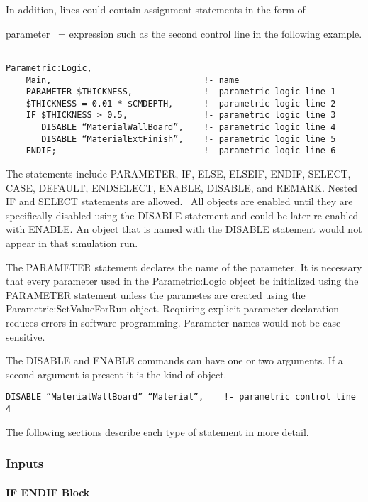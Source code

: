 In addition, lines could contain assignment statements in the form of

parameter~ = expression such as the second control line in the following example.

\begin{lstlisting}

Parametric:Logic,
    Main,                              !- name
    PARAMETER $THICKNESS,              !- parametric logic line 1
    $THICKNESS = 0.01 * $CMDEPTH,      !- parametric logic line 2
    IF $THICKNESS > 0.5,               !- parametric logic line 3
       DISABLE “MaterialWallBoard”,    !- parametric logic line 4
       DISABLE “MaterialExtFinish”,    !- parametric logic line 5
    ENDIF;                             !- parametric logic line 6
\end{lstlisting}

The statements include PARAMETER, IF, ELSE, ELSEIF, ENDIF, SELECT, CASE, DEFAULT, ENDSELECT, ENABLE, DISABLE, and REMARK. Nested IF and SELECT statements are allowed.~ All objects are enabled until they are specifically disabled using the DISABLE statement and could be later re-enabled with ENABLE. An object that is named with the DISABLE statement would not appear in that simulation run.

The PARAMETER statement declares the name of the parameter. It is necessary that every parameter used in the Parametric:Logic object be initialized using the PARAMETER statement unless the parametes are created using the Parametric:SetValueForRun object. Requiring explicit parameter declaration reduces errors in software programming. Parameter names would not be case sensitive.

The DISABLE and ENABLE commands can have one or two arguments. If a second argument is present it is the kind of object.

\begin{lstlisting}
DISABLE “MaterialWallBoard” “Material”,    !- parametric control line 4
\end{lstlisting}

The following sections describe each type of statement in more detail.

\subsubsection{Inputs}\label{inputs-1-027}

\paragraph{IF ENDIF Block}\label{if-endif-block}

